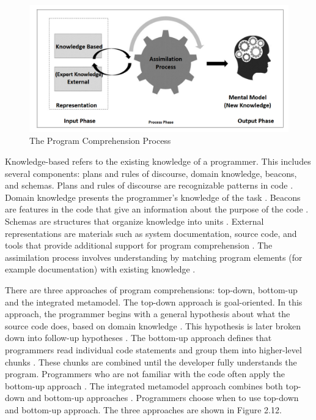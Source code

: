 \begin{figure} [H]
  \centering
  \includegraphics[width=\textwidth]{figures/program_Comprehension_Process.png}
  \caption{The Program Comprehension Process}
  \label{fig:AnhangsChor}
\end{figure}




Knowledge-based refers to the existing knowledge of a programmer. This includes several components: plans and rules of discourse, domain knowledge, beacons, and schemas. Plans and rules of discourse are recognizable patterns in code \cite{fekete2020comprehensive}. Domain knowledge presents the programmer’s knowledge of the task \cite{kadar2021program}.
Beacons are features in the code that give an information about the purpose of the code \cite{fekete2020comprehensive}. Schemas are structures that organize knowledge into units \cite{kadar2021program}. External representations are materials such as system documentation, source code, and tools that provide additional support for program comprehension \cite{kadar2021program}. The assimilation process involves understanding by matching program elements (for example documentation) with existing knowledge \cite{von1995program}. 



There are three approaches of program comprehensions:  top-down, bottom-up and the integrated metamodel. The top-down approach is goal-oriented. In this approach, the programmer begins with a general hypothesis about what the source code does, based on domain knowledge \cite{storey2005theories}. This hypothesis is later broken down into follow-up hypotheses  \cite{fekete2020comprehensive}. The bottom-up approach defines that programmers read individual code statements and group them into higher-level chunks \cite{storey2005theories}. These chunks are combined until the developer fully understands the program.  Programmers who are not familiar with the code often apply the bottom-up approach \cite{kadar2021program}. The integrated metamodel approach combines both top-down and bottom-up approaches \cite{kadar2021program}.  Programmers choose when to use top-down and bottom-up approach.  The three approaches are shown in Figure 2.12.  



